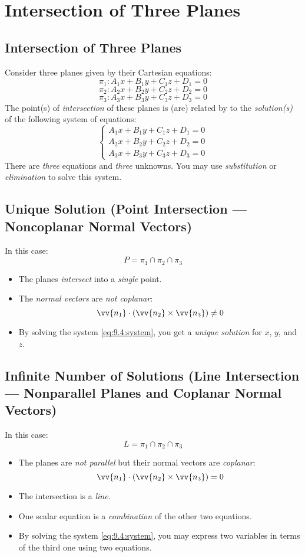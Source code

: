 \section{Intersection of Three Planes}
\subsection{Intersection of Three Planes}
	Consider three planes given by their Cartesian equations:
	\[\pi_1: A_1x + B_1y + C_1z + D_1 = 0\]
	\[\pi_2: A_2x + B_2y + C_2z + D_2 = 0\]
	\[\pi_3: A_3x + B_3y + C_3z + D_3 = 0\]
	The point(s) of \emph{intersection} of these planes is (are) related by to the \emph{solution(s)} of the following system of equations:
	\begin{equation}\label{eq:9.4:system}
		\begin{cases}
			A_1x + B_1y + C_1z + D_1 = 0\\
			A_2x + B_2y + C_2z + D_2 = 0\\
			A_3x + B_3y + C_3z + D_3 = 0
		\end{cases}
	\end{equation}
	There are \emph{three} equations and \emph{three} unknowns.
	You may use \emph{substitution} or \emph{elimination} to solve this system.
\subsection{Unique Solution (Point Intersection --- Noncoplanar Normal Vectors)}
	In this case:
	\[P = \pi_1 \cap \pi_2 \cap \pi_3\]
	\begin{itemize}
		\item The planes \emph{intersect} into a \emph{single} point.
		\item The \emph{normal vectors} are \emph{not coplanar}: \[\vv{n_1} \cdot (\vv{n_2} \times \vv{n_3}) \neq 0\]
		\item By solving the system \eqref{eq:9.4:system}, you get a \emph{unique solution} for $x$, $y$, and $z$.
	\end{itemize}
\subsection{Infinite Number of Solutions (Line Intersection --- Nonparallel Planes and Coplanar Normal Vectors)}
	In this case:
	\[L = \pi_1 \cap \pi_2 \cap \pi_3\]
	\begin{itemize}
		\item The planes are \emph{not parallel} but their normal vectors are \emph{coplanar}: \[\vv{n_1} \cdot (\vv{n_2} \times \vv{n_3}) = 0\]
		\item The intersection is a \emph{line}.
		\item One scalar equation is a \emph{combination} of the other two equations.
		\item By solving the system \eqref{eq:9.4:system}, you may express two variables in terms of the third one using two equations.
	\end{itemize}
